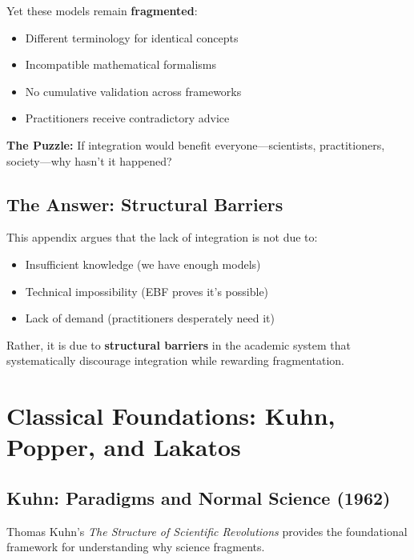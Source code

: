 Yet these models remain \textbf{fragmented}:
\begin{itemize}
\item Different terminology for identical concepts
\item Incompatible mathematical formalisms
\item No cumulative validation across frameworks
\item Practitioners receive contradictory advice
\end{itemize}

\begin{tcolorbox}[colback=red!5!white, colframe=red!75!black]
\textbf{The Puzzle:} If integration would benefit everyone—scientists, practitioners, society—why hasn't it happened?
\end{tcolorbox}

\subsection{The Answer: Structural Barriers}

This appendix argues that the lack of integration is not due to:
\begin{itemize}
\item Insufficient knowledge (we have enough models)
\item Technical impossibility (EBF proves it's possible)
\item Lack of demand (practitioners desperately need it)
\end{itemize}

Rather, it is due to \textbf{structural barriers} in the academic system that systematically discourage integration while rewarding fragmentation.



\section{Classical Foundations: Kuhn, Popper, and Lakatos}
\label{sec:meta-classics}

\subsection{Kuhn: Paradigms and Normal Science (1962)}

Thomas Kuhn's \textit{The Structure of Scientific Revolutions} provides the foundational framework for understanding why science fragments.

